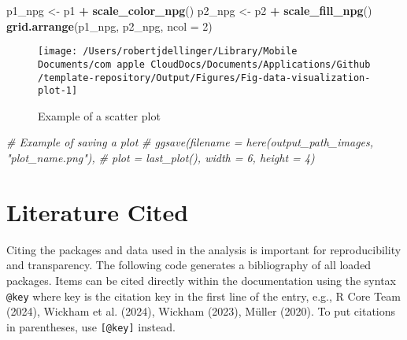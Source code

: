 \documentclass[
  12pt,
]{article}
\newenvironment{Shaded}{\begin{snugshade}}{\end{snugshade}}
\newcommand{\AttributeTok}[1]{\textcolor[rgb]{0.13,0.29,0.53}{#1}}
\newcommand{\CommentTok}[1]{\textcolor[rgb]{0.56,0.35,0.01}{\textit{#1}}}
\newcommand{\DecValTok}[1]{\textcolor[rgb]{0.00,0.00,0.81}{#1}}
\newcommand{\FunctionTok}[1]{\textcolor[rgb]{0.13,0.29,0.53}{\textbf{#1}}}
\newcommand{\NormalTok}[1]{#1}
\newcommand{\OtherTok}[1]{\textcolor[rgb]{0.56,0.35,0.01}{#1}}
\newcommand{\SpecialCharTok}[1]{\textcolor[rgb]{0.81,0.36,0.00}{\textbf{#1}}}
\begin{document}
\begin{Shaded}
\begin{Highlighting}[]
\NormalTok{p1\_npg }\OtherTok{\textless{}{-}}\NormalTok{ p1 }\SpecialCharTok{+} \FunctionTok{scale\_color\_npg}\NormalTok{()}
\NormalTok{p2\_npg }\OtherTok{\textless{}{-}}\NormalTok{ p2 }\SpecialCharTok{+} \FunctionTok{scale\_fill\_npg}\NormalTok{()}
\FunctionTok{grid.arrange}\NormalTok{(p1\_npg, p2\_npg, }\AttributeTok{ncol =} \DecValTok{2}\NormalTok{)}
\end{Highlighting}
\end{Shaded}

\begin{figure}

{\centering \texttt{[image: /Users/robertjdellinger/Library/Mobile Documents/com~apple~CloudDocs/Documents/Applications/Github/template-repository/Output/Figures/Fig-data-visualization-plot-1]} 

}

\caption{Example of a scatter plot}\label{fig:data-visualization-plot}
\end{figure}

\begin{Shaded}
\begin{Highlighting}[]
\CommentTok{\# Example of saving a plot}
\CommentTok{\# ggsave(filename = here(output\_path\_images, "plot\_name.png"), }
\CommentTok{\# plot = last\_plot(), width = 6, height = 4)}
\end{Highlighting}
\end{Shaded}

\section{Literature Cited}\label{literature-cited}

Citing the packages and data used in the analysis is important for
reproducibility and transparency. The following code generates a
bibliography of all loaded packages. Items can be cited directly within
the documentation using the syntax \texttt{@key} where key is the
citation key in the first line of the entry, e.g., R Core Team (2024),
Wickham et al. (2024), Wickham (2023), Müller (2020). To put citations
in parentheses, use \texttt{{[}@key{]}} instead.
\end{document}
